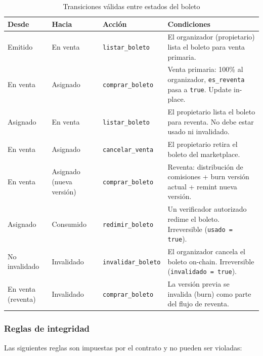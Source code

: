 \documentclass[12pt,oneside]{article}
\begin{document}
\begin{table}[htbp]
  \centering
  \begin{tabularx}{\textwidth}{@{}p{2.5cm} p{2.5cm} p{3.5cm} X@{}}
    \toprule
    \textbf{Desde} & \textbf{Hacia} & \textbf{Acción} & \textbf{Condiciones}\\
    \midrule
    Emitido & En venta & \texttt{listar\_boleto} & El organizador (propietario) lista el boleto para venta primaria.\\
    En venta & Asignado & \texttt{comprar\_boleto} & Venta primaria: 100\% al organizador, \texttt{es\_reventa} pasa a \texttt{true}. Update in-place.\\
    Asignado & En venta & \texttt{listar\_boleto} & El propietario lista el boleto para reventa. No debe estar usado ni invalidado.\\
    En venta & Asignado & \texttt{cancelar\_venta} & El propietario retira el boleto del marketplace.\\
    En venta & Asignado (nueva versión) & \texttt{comprar\_boleto} & Reventa: distribución de comisiones + burn versión actual + remint nueva versión.\\
    Asignado & Consumido & \texttt{redimir\_boleto} & Un verificador autorizado redime el boleto. Irreversible (\texttt{usado = true}).\\
    No invalidado & Invalidado & \texttt{invalidar\_boleto} & El organizador cancela el boleto on-chain. Irreversible (\texttt{invalidado = true}).\\
    En venta (reventa) & Invalidado & \texttt{comprar\_boleto} & La versión previa se invalida (burn) como parte del flujo de reventa.\\
    \bottomrule
  \end{tabularx}
  \caption{Transiciones válidas entre estados del boleto}
  \label{tab:transiciones-ticket}
\end{table}

\subsubsection{Reglas de integridad}

Las siguientes reglas son impuestas por el contrato y no pueden ser violadas:
\end{document}

